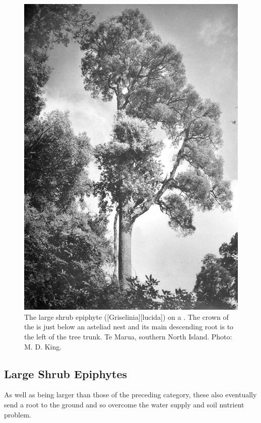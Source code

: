 \begin{figure}[htb]
\begin{minipage}[t]{0.493\textwidth}
    	\includegraphics[width=\textwidth]{graphics/figure45puka.jpg}
    	\caption[The large shrub epiphyte puka]{The large shrub epiphyte  ([Griselinia][lucida]) on a .
    	The crown of the  is just below an asteliad nest and its main descending root is to the left of the tree trunk.
    	Te Marua, southern North Island.
    	Photo: M. D. King.}%
    	\label{fig:45puka}
	\end{minipage}
\end{figure}

\subsection{Large Shrub Epiphytes}

As well as being larger than those of the preceding category, these also eventually send a root to the ground and so overcome the water supply and soil nutrient problem.

